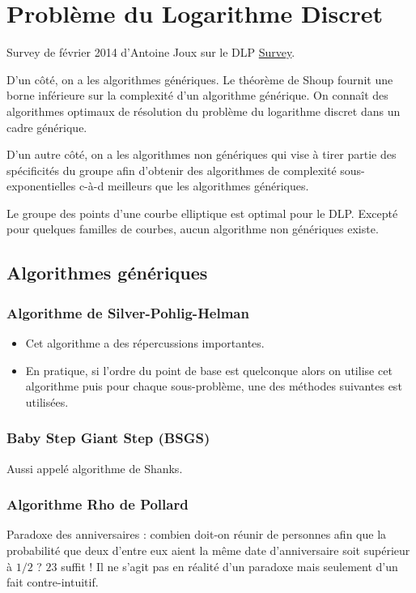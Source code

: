 \chapter{Problème du Logarithme Discret}
Survey de février 2014 d'Antoine Joux sur le DLP \href{https://www1.lip6.fr/~pierrot/papers/DlogSurvey.pdf}{Survey}.


D'un côté, on a les algorithmes génériques. Le théorème de Shoup fournit une borne inférieure sur la complexité d'un algorithme générique. On connaît des algorithmes optimaux de résolution du problème du logarithme discret dans un cadre générique. 

D'un autre côté, on a les algorithmes non génériques qui vise à tirer partie des spécificités du groupe afin d'obtenir des algorithmes de complexité sous-exponentielles c-à-d meilleurs que les algorithmes génériques. 

Le groupe des points d'une courbe elliptique est optimal pour le DLP. Excepté pour quelques familles de courbes, aucun algorithme non génériques existe.

\section{Algorithmes génériques}

\subsection{Algorithme de Silver-Pohlig-Helman}
\begin{itemize}[label=$\rightarrow$]
    \item Cet algorithme a des répercussions importantes.
    \item En pratique, si l'ordre du point de base est quelconque alors on utilise cet algorithme puis pour chaque sous-problème, une des méthodes suivantes est utilisées. 
\end{itemize}


\subsection{Baby Step Giant Step (BSGS)}
Aussi appelé algorithme de Shanks.

\subsection{Algorithme Rho de Pollard}
Paradoxe des anniversaires : combien doit-on réunir de personnes afin que la probabilité que deux d'entre eux aient la même date d'anniversaire soit supérieur à $1/2$ ? $23$ suffit ! Il ne s'agit pas en réalité d'un paradoxe mais seulement d'un fait contre-intuitif. 

